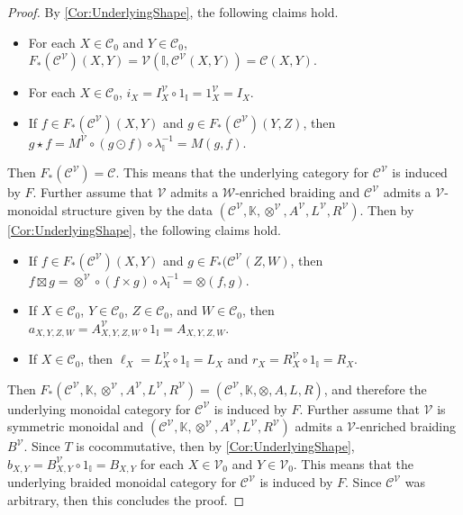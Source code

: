 \begin{proof}
    By \cref{Cor:UnderlyingShape}, the following claims hold.
    \begin{itemize}
    \item For each $X \in \mathcal{C}_0$ and $Y \in \mathcal{C}_0$, $F_*( \mathcal{C}^{\mathcal{V}} )( X, Y ) = \mathcal{V}\left( \mathbb{I}, \mathcal{C}^{\mathcal{V}}( X, Y ) \right) = \mathcal{C}( X, Y )$.
    \item For each $X \in \mathcal{C}_0$, $i_X = I^{\mathcal{V}}_X \circ 1_{\mathbb{I}} = 1^{\mathcal{V}}_X = I_X$.
    \item If $f \in F_*( \mathcal{C}^{\mathcal{V}} )( X, Y )$ and $g \in F_*( \mathcal{C}^{\mathcal{V}} )( Y, Z )$, then $g \star f = M^{\mathcal{V}} \circ ( g \odot f ) \circ \lambda_{\mathbb{I}}^{-1} = M( g, f )$.
    \end{itemize}
    Then $F_*( \mathcal{C}^{\mathcal{V}} ) = \mathcal{C}$.
    This means that the underlying category for $\mathcal{C}^{\mathcal{V}}$ is induced by $F$.
    Further assume that $\mathcal{V}$ admits a $\mathcal{W}$-enriched braiding and $\mathcal{C}^{\mathcal{V}}$ admits a $\mathcal{V}$-monoidal structure given by the data $( \mathcal{C}^{\mathcal{V}}, \mathbb{K}, \otimes^{\mathcal{V}}, A^{\mathcal{V}}, L^{\mathcal{V}}, R^{\mathcal{V}} )$.
    Then by \cref{Cor:UnderlyingShape}, the following claims hold.
    \begin{itemize}
    \item If $f \in F_*( \mathcal{C}^{\mathcal{V}} )( X, Y )$ and $g \in F_*( \mathcal{C}^{\mathcal{V}}( Z, W )$, then $f \boxtimes g = \otimes^{\mathcal{V}} \circ ( f \times g ) \circ \lambda_{\mathbb{I}}^{-1} = \otimes( f, g )$.
    \item If $X \in \mathcal{C}_0$, $Y \in \mathcal{C}_0$, $Z \in \mathcal{C}_0$, and $W \in \mathcal{C}_0$, then $a_{X,Y,Z,W} = A_{X,Y,Z,W}^{\mathcal{V}} \circ 1_{\mathbb{I}} = A_{X,Y,Z,W}$.
    \item If $X \in \mathcal{C}_0$, then $\ell_X = L_X^{\mathcal{V}} \circ 1_{\mathbb{I}} = L_X$ and $r_X = R_X^{\mathcal{V}} \circ 1_{\mathbb{I}} = R_X$.
    \end{itemize}
    Then $F_*( \mathcal{C}^{\mathcal{V}}, \mathbb{K}, \otimes^{\mathcal{V}}, A^{\mathcal{V}}, L^{\mathcal{V}}, R^{\mathcal{V}} ) = ( \mathcal{C}^{\mathcal{V}}, \mathbb{K}, \otimes, A, L, R )$, and therefore the underlying monoidal category for $\mathcal{C}^{\mathcal{V}}$ is induced by $F$.
    Further assume that $\mathcal{V}$ is symmetric monoidal and $( \mathcal{C}^{\mathcal{V}}, \mathbb{K}, \otimes^{\mathcal{V}}, A^{\mathcal{V}}, L^{\mathcal{V}}, R^{\mathcal{V}} )$ admits a $\mathcal{V}$-enriched braiding $B^{\mathcal{V}}$.
    Since $T$ is cocommutative, then by \cref{Cor:UnderlyingShape}, $b_{X,Y} = B^{\mathcal{V}}_{X,Y} \circ 1_{\mathbb{I}} = B_{X,Y}$ for each $X \in \mathcal{V}_0$ and $Y \in \mathcal{V}_0$.
    This means that the underlying braided monoidal category for $\mathcal{C}^{\mathcal{V}}$ is induced by $F$.
    Since $\mathcal{C}^{\mathcal{V}}$ was arbitrary, then this concludes the proof.
\end{proof}

